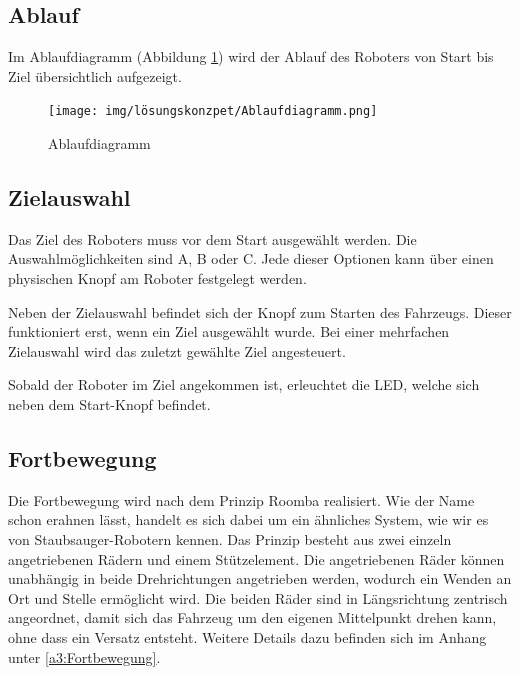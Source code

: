 \documentclass[../main.tex]{subfiles}
\begin{document}
\subsection{Ablauf}

Im Ablaufdiagramm (Abbildung \ref{img:ablaufdiagramm}) wird der Ablauf des Roboters von Start bis Ziel übersichtlich aufgezeigt.

\begin{figure}[H]
\texttt{[image: img/lösungskonzpet/Ablaufdiagramm.png]}
\caption{Ablaufdiagramm}
\label{img:ablaufdiagramm}
\end{figure}

\newpage
\subsection{Zielauswahl}

Das Ziel des Roboters muss vor dem Start ausgewählt werden. Die Auswahlmöglichkeiten sind A, B oder C. Jede dieser Optionen kann über einen physischen Knopf am Roboter festgelegt werden.

Neben der Zielauswahl befindet sich der Knopf zum Starten des Fahrzeugs. Dieser funktioniert erst, wenn ein Ziel ausgewählt wurde. Bei einer mehrfachen Zielauswahl wird das zuletzt gewählte Ziel angesteuert.

Sobald der Roboter im Ziel angekommen ist, erleuchtet die LED, welche sich neben dem Start-Knopf befindet. 

\subsection{Fortbewegung} 

Die Fortbewegung wird nach dem Prinzip Roomba realisiert. Wie der Name schon erahnen lässt, handelt es sich dabei um ein ähnliches System, wie wir es von Staubsauger-Robotern kennen. Das Prinzip besteht aus zwei einzeln angetriebenen Rädern und einem Stützelement. Die angetriebenen Räder können unabhängig in beide Drehrichtungen angetrieben werden, wodurch ein Wenden an Ort und Stelle ermöglicht wird. Die beiden Räder sind in Längsrichtung zentrisch angeordnet, damit sich das Fahrzeug um den eigenen Mittelpunkt drehen kann, ohne dass ein Versatz entsteht. Weitere Details dazu befinden sich im Anhang unter \ref{a3:Fortbewegung}.
\end{document}
